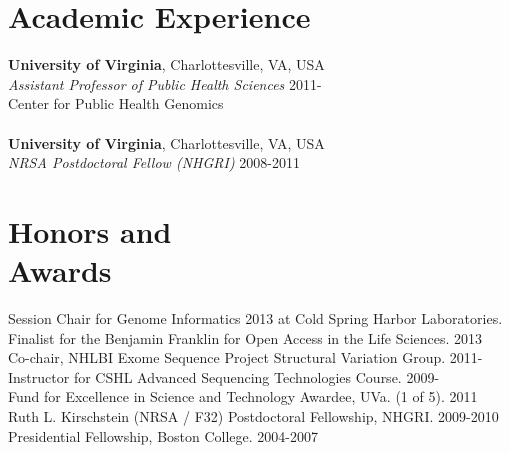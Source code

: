 \documentclass[margin,line]{cv}
\begin{document}
\begin{resume}
    \section{\mysidestyle Academic Experience}

    \textbf{University of Virginia}, Charlottesville, VA, USA\\
    \textit{Assistant Professor of Public Health Sciences}                              \hfill 2011-\\
    Center for Public Health Genomics\\
    \\
    \textbf{University of Virginia}, Charlottesville, VA, USA\\
    \textit{NRSA Postdoctoral Fellow (NHGRI)}                                          \hfill 2008-2011\\


    \section{\mysidestyle Honors and\\Awards} 

    Session Chair for Genome Informatics 2013 at Cold Spring Harbor Laboratories. \\\vspace{1mm}%
	Finalist for the Benjamin Franklin for Open Access in the Life Sciences. 2013 \\\vspace{1mm}%
    Co-chair, NHLBI Exome Sequence Project Structural Variation Group. 2011-                           \\\vspace{1mm}%
    Instructor for CSHL Advanced Sequencing Technologies Course. 2009-                                 \\\vspace{1mm}%
    Fund for Excellence in Science and Technology Awardee, UVa. (1 of 5). 2011                         \\\vspace{1mm}%
    Ruth L. Kirschstein (NRSA / F32) Postdoctoral Fellowship, NHGRI. 2009-2010                         \\\vspace{1mm}%
    Presidential Fellowship, Boston College. 2004-2007                                                               %
    

\end{resume}
\end{document}

